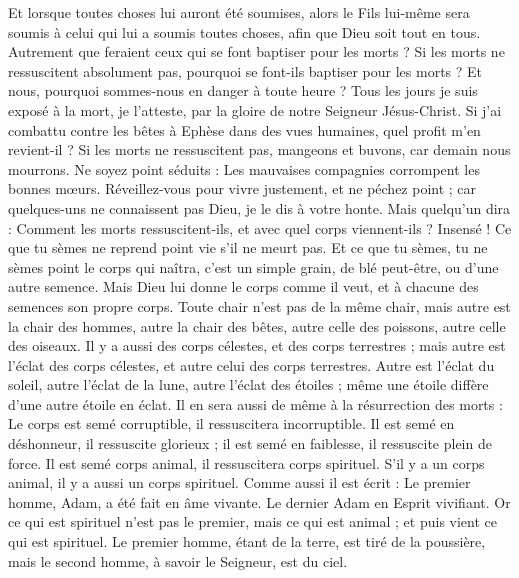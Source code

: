 \begin{multicols}{2}
Et lorsque toutes choses lui auront été soumises, alors le Fils lui-même sera soumis à celui qui lui a soumis toutes choses, afin que Dieu soit tout en tous.
Autrement que feraient ceux qui se font baptiser pour les morts ? Si les morts ne ressuscitent absolument pas, pourquoi se font-ils baptiser pour les morts ?
Et nous, pourquoi sommes-nous en danger à toute heure ?
Tous les jours je suis exposé à la mort, je l'atteste, par la gloire de notre Seigneur Jésus-Christ.
Si j'ai combattu contre les bêtes à Ephèse dans des vues humaines, quel profit m'en revient-il ? Si les morts ne ressuscitent pas, mangeons et buvons, car demain nous mourrons.
Ne soyez point séduits : Les mauvaises compagnies corrompent les bonnes mœurs.
Réveillez-vous pour vivre justement, et ne péchez point ; car quelques-uns ne connaissent pas Dieu, je le dis à votre honte.
Mais quelqu'un dira : Comment les morts ressuscitent-ils, et avec quel corps viennent-ils ?
Insensé ! Ce que tu sèmes ne reprend point vie s'il ne meurt pas.
Et ce que tu sèmes, tu ne sèmes point le corps qui naîtra, c'est un simple grain, de blé peut-être, ou d'une autre semence.
Mais Dieu lui donne le corps comme il veut, et à chacune des semences son propre corps.
Toute chair n'est pas de la même chair, mais autre est la chair des hommes, autre la chair des bêtes, autre celle des poissons, autre celle des oiseaux.
Il y a aussi des corps célestes, et des corps terrestres ; mais autre est l'éclat des corps célestes, et autre celui des corps terrestres.
Autre est l'éclat du soleil, autre l'éclat de la lune, autre l'éclat des étoiles ; même une étoile diffère d'une autre étoile en éclat.
Il en sera aussi de même à la résurrection des morts : Le corps est semé corruptible, il ressuscitera incorruptible.
Il est semé en déshonneur, il ressuscite glorieux ; il est semé en faiblesse, il ressuscite plein de force.
Il est semé corps animal, il ressuscitera corps spirituel. S'il y a un corps animal, il y a aussi un corps spirituel.
Comme aussi il est écrit : Le premier homme, Adam, a été fait en âme vivante. Le dernier Adam en Esprit vivifiant.
Or ce qui est spirituel n'est pas le premier, mais ce qui est animal ; et puis vient ce qui est spirituel.
Le premier homme, étant de la terre, est tiré de la poussière, mais le second homme, à savoir le Seigneur, est du ciel.

\end{multicols}
